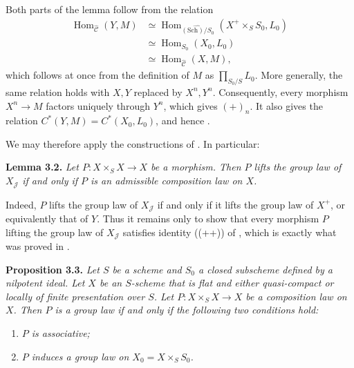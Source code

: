 Both parts of the lemma follow from the relation
\begin{align*}
 \operatorname{Hom}_{\widehat{\mathscr C}}(Y,M)
 &\simeq
 \operatorname{Hom}_{\widehat{(\mathrm{Sch})/S_0}}
       (X^+\times_S S_0,L_0)\\
 &\simeq \operatorname{Hom}_{S_0}(X_0,L_0)\\
 &\simeq \operatorname{Hom}_{\widehat{\mathscr C}}(X,M),
\end{align*}
which follows at once from the definition of \(M\) as
\(\prod_{S_0/S}L_0\). More generally, the same relation holds with
\(X,Y\) replaced by \(X^n,Y^n\). Consequently, every morphism
\(X^n\to M\) factors uniquely through \(Y^n\), which gives \((+)_{n}\).
It also gives the relation
\(C^*(Y,M)=C^*(X_0,L_0)\), and hence .

We may therefore apply the constructions of . In particular:

\medskip
\noindent{}\textbf{Lemma 3.2.}
\textit{Let \(P:X\times_S X\to X\) be a morphism. Then \(P\) lifts
the group law of \(X_{\mathscr J}\) if and only if \(P\) is an
admissible composition law on \(X\).}

Indeed, \(P\) lifts the group law of \(X_{\mathscr J}\) if and only if
it lifts the group law of \(X^+\), or equivalently that of \(Y\). Thus it
remains only to show that every morphism \(P\) lifting the group law of
\(X_{\mathscr J}\) satisfies identity ((++)) of , which is
exactly what was proved in .

\medskip
\noindent{}\textbf{Proposition 3.3.}
\textit{Let \(S\) be a scheme and \(S_0\) a closed subscheme defined by
a nilpotent ideal. Let \(X\) be an \(S\)-scheme that is flat and either
quasi-compact or locally of finite presentation over \(S\). Let
\(P:X\times_S X\to X\) be a composition law on \(X\). Then \(P\) is a
group law if and only if the following two conditions hold:}
\begin{enumerate}
\item[\SGAInlineRefTarget{sga3:iii:proposition:3-3:item:i}(i)] \textit{\(P\) is associative;}
\item[\SGAInlineRefTarget{sga3:iii:proposition:3-3:item:ii}(ii)] \textit{\(P\) induces a group law on
\(X_0=X\times_S S_0\).}
\end{enumerate}

